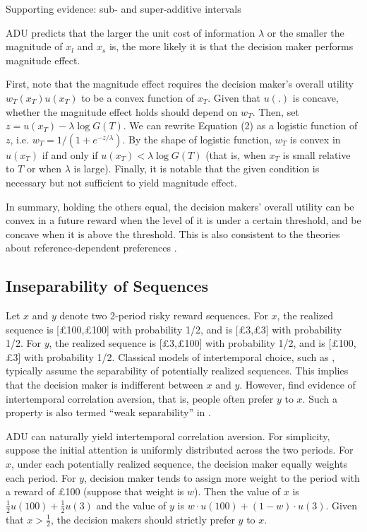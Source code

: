 \documentclass[
  12pt,
]{article}
\begin{document}
Supporting evidence: sub- and super-additive intervals

ADU predicts that the larger the unit cost of information \(\lambda\) or
the smaller the magnitude of \(x_l\) and \(x_s\) is, the more likely it
is that the decision maker performs magnitude effect.

First, note that the magnitude effect requires the decision maker's
overall utility \(w_T(x_T)u(x_T)\) to be a convex function of \(x_T\).
Given that \(u(.)\) is concave, whether the magnitude effect holds
should depend on \(w_T\). Then, set \(z = u(x_T)-\lambda\log G(T)\). We
can rewrite Equation (2) as a logistic function of \(z\), i.e.
\(w_T = 1/(1+e^{-z/\lambda})\). By the shape of logistic function,
\(w_T\) is convex in \(u(x_T)\) if and only if
\(u(x_T)<\lambda \log G(T)\) (that is, when \(x_T\) is small relative to
\(T\) or when \(\lambda\) is large). Finally, it is notable that the
given condition is necessary but not sufficient to yield magnitude
effect.

In summary, holding the others equal, the decision makers' overall
utility can be convex in a future reward when the level of it is under a
certain threshold, and be concave when it is above the threshold. This
is also consistent to the theories about reference-dependent preferences
\citep{koszegi_model_2006}.

\hypertarget{inseparability-of-sequences}{%
\subsection{Inseparability of
Sequences}\label{inseparability-of-sequences}}

Let \(x\) and \(y\) denote two 2-period risky reward sequences. For
\(x\), the realized sequence is {[}£100,£100{]} with probability 1/2,
and is {[}£3,£3{]} with probability 1/2. For \(y\), the realized
sequence is {[}£3,£100{]} with probability 1/2, and is {[}£100,£3{]}
with probability 1/2. Classical models of intertemporal choice, such as
\citet{fishburn_time_1982}, typically assume the separability of
potentially realized sequences. This implies that the decision maker is
indifferent between \(x\) and \(y\). However,
\citet{andersen_multiattribute_2018} find evidence of intertemporal
correlation aversion, that is, people often prefer \(y\) to \(x\). Such
a property is also termed ``weak separability'' in
\citet{noor_constrained_2023}.

ADU can naturally yield intertemporal correlation aversion. For
simplicity, suppose the initial attention is uniformly distributed
across the two periods. For \(x\), under each potentially realized
sequence, the decision maker equally weights each period. For \(y\),
decision maker tends to assign more weight to the period with a reward
of £100 (suppose that weight is \(w\)). Then the value of \(x\) is
\(\frac{1}{2} u(100) + \frac{1}{2} u(3)\) and the value of \(y\) is
\(w\cdot u(100) +(1-w) \cdot u(3)\). Given that \(x>\frac{1}{2}\), the
decision makers should strictly prefer \(y\) to \(x\).
\end{document}
